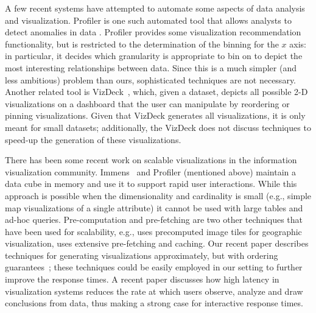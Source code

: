 A few recent systems have attempted to automate some aspects of data analysis
and visualization. Profiler is one such automated tool that allows analysts to
detect anomalies in data \cite{DBLP:conf/AVI/KandelPPHH12}.
Profiler provides some visualization recommendation functionality,
but is restricted to the determination of the binning 
for the $x$ axis: in particular, it decides which granularity
is appropriate to bin on to depict the most interesting relationships 
between data. 
Since this is a much simpler (and less ambitious) problem
than ours, sophisticated techniques are not necessary.
Another related tool 
is VizDeck~\cite{DBLP:conf/sigmod/KeyHPA12}, which, given a dataset,
depicts all possible 2-D visualizations on a dashboard that the user can
manipulate by reordering or pinning visualizations.
Given that VizDeck generates all visualizations, it is only meant for 
small datasets; additionally, the VizDeck does not discuss techniques
to speed-up the generation of these visualizations. 


There has been some recent work on
scalable visualizations in the information visualization community. Immens~\cite{2013-immens} and Profiler (mentioned above) maintain a data cube in memory and use it to support rapid user interactions. While this approach is possible when the dimensionality
and cardinality is small (e.g., simple map visualizations of a single
attribute) it cannot be used with large tables and ad-hoc queries.
Pre-computation and pre-fetching are two other techniques that have
been used for scalability, e.g., \cite{hotmap} uses
precomputed image tiles for geographic visualization,
\cite{doshi2003prefetching} uses extensive pre-fetching and caching. 
Our recent paper describes techniques for generating visualizations
approximately, but with ordering guarantees~\cite{DBLP:journals/corr/KimBPIMR14};
these techniques could be easily employed in our setting to further
improve the response times.
A recent paper \cite{2014-viz-latency} discusses how high
latency in visualization systems reduces the rate at which users observe,
analyze and draw conclusions from data, thus making a strong case for
interactive response times.

